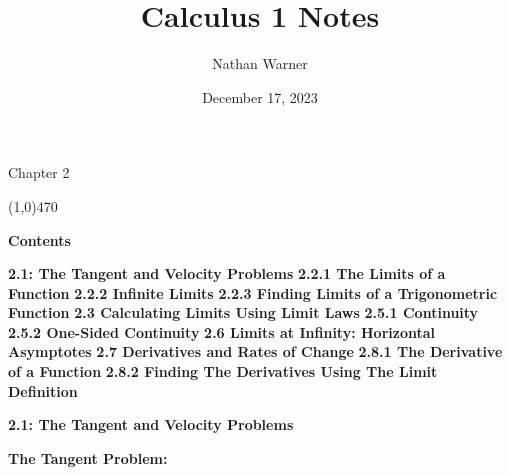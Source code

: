 \documentclass{report}
\title{\Huge{Calculus 1 Notes}}
\author{\huge{Nathan Warner}}
\date{\huge{December 17, 2023}}
\begin{document}
    \maketitle

    \begin{center}
        \Huge{Chapter 2}
    \end{center}
    \line(1,0){470} 

    \bigbreak \noindent \bigbreak \noindent  
    \begin{Huge}
        \noindent \textbf{Contents}
    \end{Huge}
    
    \bigbreak \noindent \bigbreak \noindent 
    \begin{Large}
        \textbf{2.1: The Tangent and Velocity Problems }
        \bigbreak \noindent \bigbreak \noindent  
        \textbf{2.2.1 The Limits of a Function }
        \bigbreak \noindent \bigbreak \noindent  
        \textbf{2.2.2 Infinite Limits }
        \bigbreak \noindent \bigbreak \noindent 
        \textbf{2.2.3 Finding Limits of a Trigonometric Function }
        \bigbreak \noindent \bigbreak \noindent 
        \textbf{2.3 Calculating Limits Using Limit Laws}
        \bigbreak \noindent \bigbreak \noindent 
        \textbf{2.5.1 Continuity }
        \bigbreak \noindent \bigbreak \noindent 
        \textbf{2.5.2 One-Sided Continuity}
        \bigbreak \noindent \bigbreak \noindent 
        \textbf{2.6 Limits at Infinity: Horizontal Asymptotes}
        \bigbreak \noindent \bigbreak \noindent  
        \textbf{2.7 Derivatives and Rates of Change}
        \bigbreak \noindent \bigbreak \noindent 
        \textbf{2.8.1 The Derivative of a Function}
        \bigbreak \noindent \bigbreak \noindent 
        \textbf{2.8.2 Finding The Derivatives Using The Limit Definition}
    \end{Large}

    \pagebreak
    \begin{Large}
        \noindent \textbf{2.1: The Tangent and Velocity Problems}
    \end{Large}

    \bigbreak \noindent \bigbreak \noindent \bigbreak \noindent 
    \begin{large}
       \noindent \textbf{The Tangent Problem: } 
    \end{large}
   
    \bigbreak \noindent 
   
\end{document}
